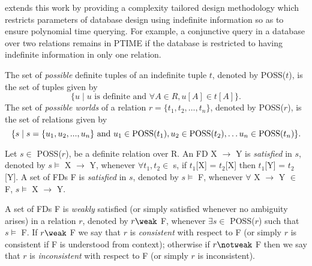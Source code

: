 \medskip

\cite{ivv95} extends this work by providing a complexity tailored
design methodology which restricts parameters of database design using
indefinite information so as to ensure polynomial time querying. For
example, a conjunctive query in a database over two relations remains
in PTIME if the database is restricted to having indefinite
information in only one relation.


\begin{definition}
\begin{rm}
The set of {\em possible} definite tuples of an indefinite tuple $t$, 
denoted by POSS($t$), is the set of tuples given by
\begin{displaymath}
\{u \mid u \mbox{ is definite and } \forall A \in R, u[A] \in t[A]\}.
\end{displaymath}
The set of {\em possible worlds}
of a relation $r = \{t_1, t_2, \ldots, t_n\}$, denoted by POSS($r$),
is the set of relations given by
\begin{displaymath}
\{s \mid s = \{u_1, u_2, ..., u_n\} \mbox{ and } 
u_1 \in {\rm POSS}(t_1), u_2 \in {\rm POSS}(t_2),
\ldots u_n \in {\rm POSS}(t_n)\}.
\end{displaymath}
 \end{rm}
\end{definition}


\begin{definition}\label{def:sat-indef}
\begin{rm}
Let $s \in$ POSS($r$), be a definite relation over R.
An FD X $\to$ Y is {\em satisfied} in $s$,
denoted by $s \models$ X $\to$ Y, whenever
$\forall t_1, t_2 \in$ s, if $t_1$[X] = $t_2$[X] then $t_1$[Y] = $t_2$[Y].
A set of FDs F is {\em satisfied} in $s$,
denoted by $s \models$ F, whenever
$\forall$ X $\to$ Y $\in$ F, $s \models$ X $\to$ Y.

\smallskip

A set of FDs F is {\em weakly} satisfied  
(or simply satisfied whenever no ambiguity arises) in a relation $r$,
denoted by $r \weak$ F, whenever 
$\exists s \in$ POSS($r$) such that $s \models$ F.
If $r \weak$ F we say that $r$ is {\em consistent} with respect to F 
(or simply $r$ is consistent if F is understood from context);
otherwise if $r \notweak$ F then we say that $r$ is {\em inconsistent}
with respect to F (or simply $r$ is inconsistent).
\end{rm}
\end{definition}

